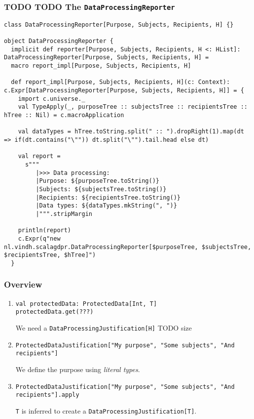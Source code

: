 \documentclass[aspectratio=169]{beamer}
\begin{document}
\begin{frame}[fragile]
\frametitle{TODO TODO The \texttt{DataProcessingReporter}}

\begin{lstlisting}[style=myScalastyle,frame=none]
class DataProcessingReporter[Purpose, Subjects, Recipients, H] {}

object DataProcessingReporter {
  implicit def reporter[Purpose, Subjects, Recipients, H <: HList]: DataProcessingReporter[Purpose, Subjects, Recipients, H] =
  macro report_impl[Purpose, Subjects, Recipients, H]

  def report_impl[Purpose, Subjects, Recipients, H](c: Context): c.Expr[DataProcessingReporter[Purpose, Subjects, Recipients, H]] = {
    import c.universe._
    val TypeApply(_, purposeTree :: subjectsTree :: recipientsTree :: hTree :: Nil) = c.macroApplication

    val dataTypes = hTree.toString.split(" :: ").dropRight(1).map(dt => if(dt.contains("\"")) dt.split("\"").tail.head else dt)

    val report =
      s"""
         |>>> Data processing:
         |Purpose: ${purposeTree.toString()}
         |Subjects: ${subjectsTree.toString()}
         |Recipients: ${recipientsTree.toString()}
         |Data types: ${dataTypes.mkString(", ")}
         |""".stripMargin

    println(report)
    c.Expr(q"new nl.vindh.scalagdpr.DataProcessingReporter[$purposeTree, $subjectsTree, $recipientsTree, $hTree]")
  }
\end{lstlisting}

\end{frame}


\begin{frame}[fragile]
\frametitle{Overview}

\begin{enumerate}
\item
\begin{lstlisting}[style=myScalastyle,frame=none]
val protectedData: ProtectedData[Int, T]
protectedData.get(???)
\end{lstlisting}
We need a \footnotesize{\texttt{DataProcessingJustification[H]}} TODO size
\pause
\item
\begin{lstlisting}[style=myScalastyle,frame=none]
ProtectedDataJustification["My purpose", "Some subjects", "And recipients"]
\end{lstlisting}
We define the purpose using \textit{literal types}.
\pause
\item
\begin{lstlisting}[style=myScalastyle,frame=none]
ProtectedDataJustification["My purpose", "Some subjects", "And recipients"].apply
\end{lstlisting}
\footnotesize{\texttt{T}} is inferred to create a \footnotesize{\texttt{DataProcessingJustification[T]}}.
\pause
\end{enumerate}

\end{frame}
\end{document}
